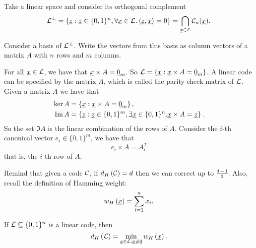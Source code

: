 Take a linear space and consider its orthogonal complement
\begin{equation*}
	\mathcal{L}^\perp = \left\{
		\underline{z} : \underline{z} \in \{0, 1\}^n, \forall \underline{x} \in \mathcal{L} . \left< {\underline{z}}, {\underline{x}} \right> = 0
	\right\}
	=
	\bigcap_{\underline{x} \in \mathcal{L}} \mathcal{C}_n(\underline{x}).
\end{equation*}

Consider a basis of $\mathcal{L}^\perp$.
Write the vectors from this basis as column vectors of a matrix $A$ with $n$ rows and $m$ columns.

For all $\underline{x} \in \mathcal{L}$, we have that $\underline{x} \times A = \underline{0}_m$.
So $\mathcal{L} = \left\{ \underline{x} : \underline{x} \times A = \underline{0}_m \right\}$.
A linear code can be specified by the matrix $A$, which is called the parity check matrix of $\mathcal{L}$.
Given a matrix $A$ we have that
\begin{align*}
	\ker A & = \left\{ \underline{x} : \underline{x} \times A = \underline{0}_m \right\},
	\\
	\operatorname{Im} A & = \left\{ \underline{z} : \underline{z} \in \{0, 1\}^m, \exists \underline{x} \in \{0, 1\}^n . \underline{x} \times A = \underline{z} \right\}.
\end{align*}
So the set $\Im A$ is the linear combination of the rows of $A$.
Consider the $i$-th canonical vector $e_i \in \{0, 1\}^m$, we have that
\begin{equation*}
	e_i \times A = A_i^T
\end{equation*}
that is, the $i$-th row of $A$.

Remind that given a code $\mathcal{C}$, if $d_H \left({\mathcal{C}}\right) = d$ then we can correct up to $\frac{d-1}{2}$.
Also, recall the definition of Hamming weight:
\begin{equation*}
	w_H\left(\underline{x}\right) = \sum_{i = 1}^n x_i.
\end{equation*}

\begin{obs}
	If $\mathcal{L} \subseteq \{0, 1\}^n$ is a linear code, then
	\begin{equation*}
		d_H \left({\mathcal{L}}\right) = \min_{\underline{x} \in \mathcal{L} : \underline{x} \neq \underline{0}} w_H\left(\underline{x}\right).
	\end{equation*}
\end{obs}

